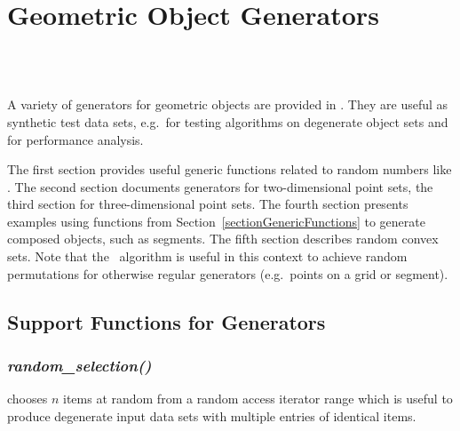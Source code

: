 
\ccParDims

\chapter{Geometric Object Generators}
\label{chapterGenerators}
\\
\\

A variety of generators for geometric objects are provided in \cgal.
They are useful as synthetic test data sets, e.g.~for testing
algorithms on degenerate object sets and for performance analysis.

The first section provides useful generic functions related to random
numbers like . The second section
documents generators for two-dimensional point sets, the third section
for three-dimensional point sets. The fourth section presents examples
using functions from Section~\ref{sectionGenericFunctions} to generate
composed objects, such as segments.  The fifth section describes
random convex sets.  Note that the \stl\ algorithm
 is useful in this context to achieve random
permutations for otherwise regular generators (e.g.~points on a grid
or segment).

\section{Support Functions for Generators}


\subsection{{\it random\_selection()}}
\label{sectionRandomSelection}

 chooses $n$ items at random from a random
access iterator range which is useful to produce degenerate input data
sets with multiple entries of identical items.

